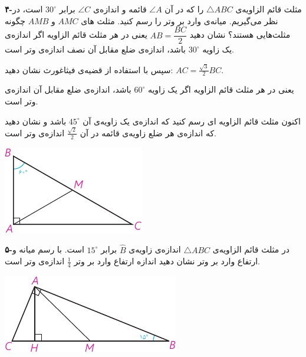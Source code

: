 \documentclass[12pt, a4paper]{book}
\newenvironment{Figure}
{\par\medskip\noindent\minipage{\linewidth}}
{\endminipage\par\medskip}
\begin{document}
\begin{multicols}{2}
			\bigskip
			\textbf{۴-}مثلث قائم الزاویه‌ی 
			$\triangle ABC$
			را که در آن 
			$\angle A$
			قائمه و اندازه‌ی
			$\angle C$
			برابر 
			$30^{\circ}$
			است، در نظر می‌گیریم. میانه‌ی وارد بر وتر را رسم کنید. مثلث های 
			$AMC$
			و
			$AMB$
			چگونه مثلث‌هایی هستند؟ نشان دهید 
			$AB = \dfrac{BC}{2}$
			یعنی در هر مثلث قائم الزاویه اگر اندازه‌ی یک زاویه 
			$30^{\circ}$
			باشد، اندازه‌ی ضلع مقابل آن نصف اندازه‌ی وتر است.
			
			سپس با استفاده از قضیه‌ی فیثاغورث نشان دهید: 
			$AC = \frac{\sqrt{3}}{2}BC$.
			
			یعنی در هر مثلث قائم الزاویه اگر یک زاویه 
			$60^{\circ}$
			باشد، اندازه‌ی ضلع مقابل آن  اندازه‌ی وتر است.
			
			اکنون مثلث قائم الزاویه ای رسم کنید که اندازه‌ی یک زاویه‌ی آن 
			$45^{\circ}$
			باشد و نشان دهید که اندازه‌ی هر ضلع زاویه‌ی قائمه در آن 
			$\frac{\sqrt{2}}{2}$
			اندازه‌ی وتر است.

		\begin{Figure}
			\centering
			\includegraphics[scale=1.2]{"Shapes/Fasl - 3/Dars 1/PDFs/P64-S1.pdf"}
		\end{Figure}

			\bigskip
			\textbf{۵-}در مثلث قائم الزاویه‌ی 
			$\triangle ABC$
			اندازه‌ی زاویه‌ی 
			$\widehat{B}$
			برابر 
			$15^{\circ}$
			است. با رسم میانه و ارتفاع وارد بر وتر نشان دهید اندازه‌ ارتفاع وارد بر وتر 
			$\frac14$
			اندازه‌ی وتر است.
			
			\begin{Figure}
				\centering
				\includegraphics[scale=1.2]{"Shapes/Fasl - 3/Dars 1/PDFs/P64-S2.pdf"}
			\end{Figure}



\end{multicols}
\end{document}
